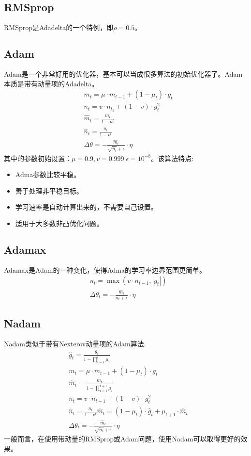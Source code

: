 \documentclass[11pt]{report}
\begin{document}
\subsection{RMSprop}
RMSprop是Adadelta的一个特例，即$\rho=0.5$。
\subsection{Adam}
Adam是一个非常好用的优化器，基本可以当成很多算法的初始优化器了。Adam本质是带有动量项的Adadelta。
\begin{equation}
	\begin{split}
		& m_t=\mu\cdot m_{t-1}+(1-\mu_t)\cdot g_t\\
		& n_t=v\cdot n_{t_1}+(1-v)\cdot g_t^2\\
		& \hat{m}_t=\frac{m_t}{1-\mu^t}\\
		& \hat{n}_t=\frac{n_t}{1-v^t}\\
		& \Delta\theta=-\frac{\hat{m}_t}{\sqrt{\hat{n}_t}+\epsilon}\cdot\eta
	\end{split}
\end{equation}
其中的参数初始设置：$\mu=0.9,v=0.999.\epsilon=10^{-8}$。该算法特点:
\begin{itemize}
	\item Adma参数比较平稳。
	\item 善于处理非平稳目标。
	\item 学习速率是自动计算出来的，不需要自己设置。
	\item 适用于大多数非凸优化问题。
\end{itemize}
\subsection{Adamax}
Adamax是Adam的一种变化，使得Adma的学习率边界范围更简单。
\begin{equation}
	\begin{split}
		& n_t=\max(v\cdot n_{t-1},|g_t|)\\
		& \Delta\theta_t=-\frac{\hat{m}_t}{n_t+\epsilon}\cdot \eta
	\end{split}
\end{equation}
\subsection{Nadam}
Nadam类似于带有Nexterov动量项的Adam算法.
\begin{equation}
	\begin{split}
		& \hat{g}_t=\frac{g_t}{1-\prod_{i=1}^t\mu_i}\\
		& m_t=\mu\cdot m_{t-1}+(1-\mu_t)\cdot g_t\\
		& \hat{m}_t=\frac{m_t}{1-\prod_{i=1}^{t+1}\mu_i}\\
		& n_t=v\cdot n_{t-1}+(1-v)\cdot g_t^2\\
		& \hat{n}_t=\frac{n_t}{1-v^t}\hat{m}_t=(1-\mu_t)\cdot\hat{g}_t+\mu_{t+1}\cdot\hat{m}_t\\
		& \Delta\theta_t=-\frac{\hat{m}_t}{\sqrt{\hat{n}_t}+\epsilon}\cdot\eta
	\end{split}
\end{equation}
一般而言，在使用带动量的RMSprop或Adam问题，使用Nadam可以取得更好的效果。
\end{document}
